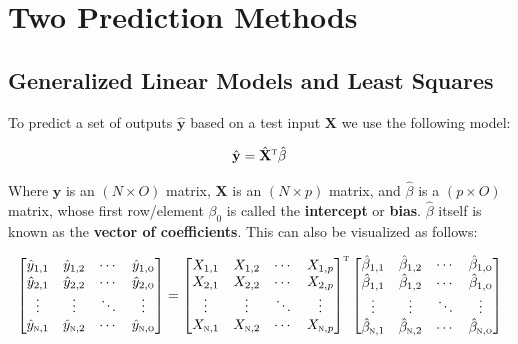 \documentclass[a4paper,10pt,english]{book}
\begin{document}
\section{Two Prediction Methods}

\subsection{Generalized Linear Models and Least Squares}

To predict a set of outputs $\hat{\mathbf{y}}$ based on a test input $\mathbf{X}$ we use the following model:

\begin{equation*}
\hat{\mathbf{y}} = \hat{\mathbf{X}}^\textsc{t} \hat{\beta}
\end{equation*}

Where $\mathbf{y}$ is an $(N \times O)$ matrix, $\mathbf{X}$ is an $(N \times p)$ matrix, and $\hat{\beta}$ is a $(p \times O)$ matrix, whose first row/element $\beta_0$ is called the \textbf{intercept}\label{vocab:intercept0} or \textbf{bias}\label{vocab:bias0}.  $\hat{\beta}$ itself is known as the \textbf{vector of coefficients}\label{vocab:vectorofcoefficients0}. This can also be visualized as follows:

\begin{equation*}
\begin{bmatrix}
\hat{y}_{1,1} & \hat{y}_{1,2} & \cdots & \hat{y}_{1,\textsc{o}} \\
\hat{y}_{2,1} & \hat{y}_{2,2} & \cdots & \hat{y}_{2,\textsc{o}} \\
\vdots & \vdots & \ddots & \vdots \\
\hat{y}_{\textsc{n},1} & \hat{y}_{\textsc{n},2} & \cdots & \hat{y}_{\textsc{n},\textsc{o}}
\end{bmatrix}
=
\begin{bmatrix}
X_{1,1} & X_{1,2} & \cdots & X_{1,p} \\
X_{2,1} & X_{2,2} & \cdots & X_{2,p} \\
\vdots & \vdots & \ddots & \vdots \\
X_{\textsc{n},1} & X_{\textsc{n},2} & \cdots & X_{\textsc{n},p}
\end{bmatrix}^\textsc{t}
\begin{bmatrix}
\hat{\beta}_{1,1} & \hat{\beta}_{1,2} & \cdots & \hat{\beta}_{1,\textsc{o}} \\
\hat{\beta}_{1,1} & \hat{\beta}_{1,2} & \cdots & \hat{\beta}_{1,\textsc{o}} \\
\vdots & \vdots & \ddots & \vdots \\
\hat{\beta}_{\textsc{n},1} & \hat{\beta}_{\textsc{n},2} & \cdots & \hat{\beta}_{\textsc{n},\textsc{o}}
\end{bmatrix}
\end{equation*}
\end{document}
